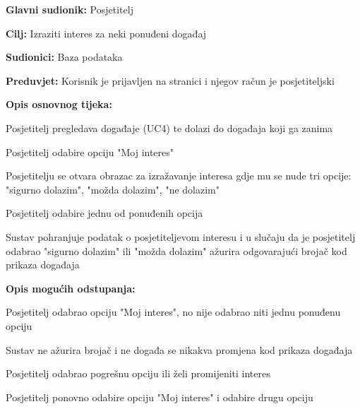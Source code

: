 					\noindent {}
\begin{packed_item}
	\item \textbf{Glavni sudionik:} Posjetitelj
	\item  \textbf{Cilj:} Izraziti interes za neki ponuđeni događaj
	\item  \textbf{Sudionici:} Baza podataka
	\item  \textbf{Preduvjet:} Korisnik je prijavljen na stranici i njegov račun je posjetiteljski
	\item  \textbf{Opis osnovnog tijeka:} 
	
	\item[] \begin{packed_enum}
		
		\item Posjetitelj pregledava događaje (UC4) te dolazi do događaja koji ga zanima
		\item Posjetitelj odabire opciju "Moj interes" 
		\item Posjetitelju se otvara obrazac za izražavanje interesa gdje mu se nude tri opcije: "sigurno dolazim", "možda dolazim", "ne dolazim"
		\item Posjetitelj odabire jednu od ponuđenih opcija
		\item Sustav pohranjuje podatak o posjetiteljevom interesu i u slučaju da je posjetitelj odabrao "sigurno dolazim" ili "možda dolazim" ažurira odgovarajući brojač kod prikaza događaja
	\end{packed_enum}
	
		\item  \textbf{Opis mogućih odstupanja:}
	
	\item[] \begin{packed_item}
		
		\item[2] Posjetitelj odabrao opciju "Moj interes", no nije odabrao niti jednu ponuđenu opciju
		\item[] \begin{packed_enum}
			
			\item Sustav ne ažurira brojač i ne događa se nikakva promjena kod prikaza događaja
			
		\end{packed_enum}
		\item[4] Posjetitelj odabrao pogrešnu opciju ili želi promijeniti interes
		\item[] \begin{packed_enum}
			
			\item Posjetitelj ponovno odabire opciju "Moj interes" i odabire drugu opciju
			
		\end{packed_enum}
		
	\end{packed_item}

\end{packed_item}


